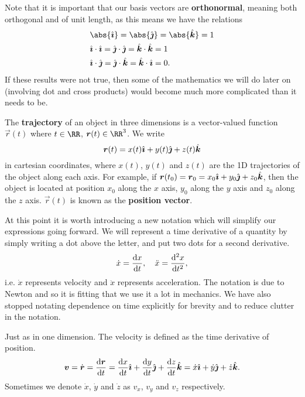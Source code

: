 \documentclass[../classical_mechanics.tex]{subfiles}
\begin{document}
        Note that it is important that our basis vectors are \textbf{orthonormal}, meaning both orthogonal and of unit length, as this means we have the relations
        \begin{align}
            &\abs{\ihat}=\abs{\jhat}=\abs{\khat}=1\label{eq:basis-vec-magnitude}\\
            &\ihat\cdot\ihat=\jhat\cdot\jhat=\khat\cdot\khat=1\label{eq:basis-vec-normal}\\
            &\ihat\cdot\jhat=\jhat\cdot\khat=\khat\cdot\ihat=0\label{eq:basis-vec-ortho}.
        \end{align}
        If these results were not true, then some of the mathematics we will do later on (involving dot and cross products) would become much more complicated than it needs to be.
        \begin{definition}
            The \textbf{trajectory} of an object in three dimensions is a vector-valued function $\vec{r}(t)$ where $t\in\RR$, $\vec{r}(t)\in\RR^3$.
            We write
            \begin{equation}
                \boldsymbol{r}(t)=x(t)\hat{\boldsymbol{\imath}}+y(t)\hat{\boldsymbol{\jmath}}+z(t)\hat{\boldsymbol{k}}
            \end{equation}
            in cartesian coordinates, where $x(t)$, $y(t)$ and $z(t)$ are the 1D trajectories of the object along each axis.
            For example, if $\boldsymbol{r}(t_0)=\boldsymbol{r}_0=x_0\hat{\boldsymbol{\imath}}+y_0\hat{\boldsymbol{\jmath}}+z_0\hat{\boldsymbol{k}}$, then the object is located at position $x_0$ along the $x$ axis, $y_0$ along the $y$ axis and $z_0$ along the $z$ axis.
            $\vec{r}(t)$ is known as the \textbf{position vector}.
        \end{definition}
        At this point it is worth introducing a new notation which will simplify our expressions going forward.
        We will represent a time derivative of a quantity by simply writing a dot above the letter, and put two dots for a second derivative.
        \begin{equation}
            \dot{x}=\dv{x}{t},\quad\ddot{x}=\dv[2]{x}{t},
        \end{equation}
        i.e. $\dot x$ represents velocity and $\ddot x$ represents acceleration.
        The notation is due to Newton and so it is fitting that we use it a lot in mechanics.
        We have also stopped notating dependence on time explicitly for brevity and to reduce clutter in the notation.
        \begin{definition}
            Just as in one dimension.
            The velocity is defined as the time derivative of position.
            \begin{equation}
                \vec{v}=\dot{\vec{r}}=\dv{\vec{r}}{t}=\dv{x}{t}\ihat+\dv{y}{t}\jhat+\dv{z}{t}\khat=\dot{x}\ihat+\dot{y}\jhat+\dot{z}\khat.
            \end{equation}
            Sometimes we denote $\dot{x}$, $\dot{y}$ and $\dot{z}$ as $v_x$, $v_y$ and $v_z$ respectively.
        \end{definition}
\end{document}
